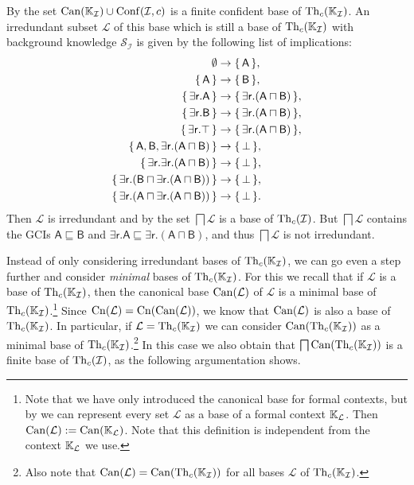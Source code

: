 \begin{Example}
  By  the set $\operatorname{Can}({\mathbb{K}}_{\mathcal{I}}) \cup \operatorname{Conf}(\mathcal{I}, c)$
  is a finite confident base of $\operatorname{Th}_c({\mathbb{K}}_{\mathcal{I}})$.  An irredundant subset
  $\mathcal{L}$ of this base which is still a base of $\operatorname{Th}_c({\mathbb{K}}_{\mathcal{I}})$ with
  background knowledge $\mathcal{S}_{\mathcal{I}}$ is given by the following list of
  implications:
  \begin{align*}
    \emptyset &\to {\ensuremath{\{\,\mathsf A\,\}}},\\
    {\{\,\mathsf A\,\}}    &\to {\ensuremath{\{\,\mathsf B\,\}}},\\
    {\{\,\mathsf{\exists r.A}\,\}} &\to {\ensuremath{\{\,\mathsf{\exists r.(A \sqcap B)}\,\}}},\\
    {\{\,\mathsf{\exists r.B}\,\}} &\to {\ensuremath{\{\,\mathsf{\exists r.(A \sqcap B)}\,\}}},\\
    {\{\,\mathsf{\exists r.\top}\,\}} &\to {\ensuremath{\{\,\mathsf{\exists r.(A \sqcap B)}\,\}}},\\
    {\{\,\mathsf{A, B, \exists r.(A \sqcap B)}\,\}} &\to {\ensuremath{\{\,\bot\,\}}},\\
    {\{\,\mathsf{\exists r.\exists r.(A \sqcap B)}\,\}} &\to {\ensuremath{\{\,\bot\,\}}},\\
    {\{\,\mathsf{\exists r.(B \sqcap \exists r.(A \sqcap B))}\,\}} &\to {\ensuremath{\{\,\bot\,\}}},\\
    {\{\,\mathsf{\exists r.(A \sqcap \exists r.(A \sqcap B))}\,\}} &\to {\ensuremath{\{\,\bot\,\}}}.
  \end{align*}
  Then $\mathcal{L}$ is irredundant and by
   the set $\bigsqcap
  \mathcal{L}$ is a base of $\operatorname{Th}_c(\mathcal{I})$.  But $\bigsqcap \mathcal{L}$ contains
  the GCIs $\mathsf{A \sqsubseteq B}$ and $\mathsf{\exists r. A \sqsubseteq \exists r. (A
    \sqcap B)}$, and thus $\bigsqcap \mathcal{L}$ is not irredundant.
\end{Example}

Instead of only considering irredundant bases of $\operatorname{Th}_c({\mathbb{K}}_{\mathcal{I}})$, we can go
even a step further and consider \emph{minimal} bases of $\operatorname{Th}_c({\mathbb{K}}_{\mathcal{I}})$.
For this we recall that if $\mathcal{L}$ is a base of $\operatorname{Th}_c({\mathbb{K}}_{\mathcal{I}})$, then
the canonical base $\operatorname{Can}(\mathcal{L})$ of $\mathcal{L}$ is a minimal base of $\operatorname{Th}_c({\mathbb{K}}_{\mathcal{I}})$.\footnote{Note that we have only introduced the canonical base for
  formal contexts, but by  we can represent
  every set $\mathcal{L}$ as a base of a formal context ${\mathbb{K}}_{\mathcal{L}}$.  Then
  $\operatorname{Can}(\mathcal{L}) := \operatorname{Can}({\mathbb{K}}_{\mathcal{L}})$.  Note that this definition is
  independent from the context ${\mathbb{K}}_{\mathcal{L}}$ we use.}  Since $\operatorname{Cn}(\mathcal{L}) =
\operatorname{Cn}(\operatorname{Can}(\mathcal{L}))$, we know that $\operatorname{Can}(\mathcal{L})$ is also a base of $\operatorname{Th}_c({\mathbb{K}}_{\mathcal{I}})$.  In particular, if $\mathcal{L} = \operatorname{Th}_c({\mathbb{K}}_{\mathcal{I}})$ we can
consider $\operatorname{Can}(\operatorname{Th}_c({\mathbb{K}}_{\mathcal{I}}))$ as a minimal base of $\operatorname{Th}_c({\mathbb{K}}_{\mathcal{I}})$.\footnote{Also note that $\operatorname{Can}(\mathcal{L}) = \operatorname{Can}(\operatorname{Th}_c({\mathbb{K}}_{\mathcal{I}}))$ for all bases $\mathcal{L}$ of $\operatorname{Th}_c({\mathbb{K}}_{\mathcal{I}})$.}  In
this case we also obtain that $\bigsqcap \operatorname{Can}(\operatorname{Th}_c({\mathbb{K}}_{\mathcal{I}}))$ is a finite
base of $\operatorname{Th}_c(\mathcal{I})$, as the following argumentation shows.

